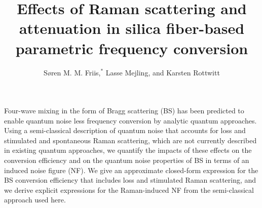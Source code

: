 \documentclass[10pt,letterpaper]{article}
\begin{document}
\title{Effects of Raman scattering and attenuation in silica fiber-based parametric frequency conversion}

\author{S\o{}ren M. M. Friis,$^{*}$ Lasse Mejling, and Karsten Rottwitt}

\address{Department of Photonics Engineering, Technical University of Denmark, \\ 2800 Kongens Lyngby, Denmark}




\begin{abstract*}
Four-wave mixing in the form of Bragg scattering (BS) has been predicted to enable quantum noise less frequency conversion by analytic quantum approaches. Using a semi-classical description of quantum noise that accounts for loss and stimulated and spontaneous Raman scattering, which are not currently described in existing quantum approaches, we quantify the impacts of these effects on the conversion efficiency and on the quantum noise properties of BS in terms of an induced noise figure (NF). We give an approximate closed-form expression for the BS conversion efficiency that includes loss and stimulated Raman scattering, and we derive explicit expressions for the Raman-induced NF from the semi-classical approach used here. \vspace{1cm}
\end{abstract*}




\end{document}

